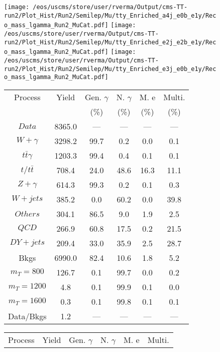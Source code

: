 \begin{figure}
\centering
\texttt{[image: /eos/uscms/store/user/rverma/Output/cms-TT-run2/Plot\_Hist/Run2/Semilep/Mu/tty\_Enriched\_a4j\_e0b\_e1y/Reco\_mass\_lgamma\_Run2\_MuCat.pdf]}
\texttt{[image: /eos/uscms/store/user/rverma/Output/cms-TT-run2/Plot\_Hist/Run2/Semilep/Mu/tty\_Enriched\_e2j\_e2b\_e1y/Reco\_mass\_lgamma\_Run2\_MuCat.pdf]}
\texttt{[image: /eos/uscms/store/user/rverma/Output/cms-TT-run2/Plot\_Hist/Run2/Semilep/Mu/tty\_Enriched\_e3j\_e0b\_e1y/Reco\_mass\_lgamma\_Run2\_MuCat.pdf]}
\begin{minipage}[c]{0.32\textwidth}
\centering
\tiny{
\begin{tabular}{cccccc}
\hline
Process & Yield & Gen. $\gamma$ & N. $\gamma$ & M. e & Multi. \\
 &  & (\%) & (\%) & (\%) & (\%)  \\
\hline
                                                                      $ Data $ &  8365.0 &  --- &  --- &  --- &  ---\\
$ W+\gamma $ &  3298.2 &  99.7 &  0.2 &  0.0 &  0.1\\
$ t\bar{t}\gamma $ &  1203.3 &  99.4 &  0.4 &  0.1 &  0.1\\
$ t/t\bar{t} $ &  708.4 &  24.0 &  48.6 &  16.3 &  11.1\\
$ Z+\gamma $ &  614.3 &  99.3 &  0.2 &  0.1 &  0.3\\
$ W+jets $ &  385.2 &  0.0 &  60.2 &  0.0 &  39.8\\
$ Others $ &  304.1 &  86.5 &  9.0 &  1.9 &  2.5\\
$ QCD $ &  266.9 &  60.8 &  17.5 &  0.2 &  21.5\\
$ DY+jets $ &  209.4 &  33.0 &  35.9 &  2.5 &  28.7\\
Bkgs &  6990.0 &  82.4 &  10.6 &  1.8 &  5.2\\
$ m_{T} = 800 $ &  126.7 &  0.1 &  99.7 &  0.0 &  0.2\\
$ m_{T} = 1200 $ &  4.8 &  0.1 &  99.9 &  0.1 &  0.0\\
$ m_{T} = 1600 $ &  0.3 &  0.1 &  99.8 &  0.1 &  0.1\\
Data/Bkgs &  1.2 &  --- &  --- &  --- &  ---\\
\hline
\end{tabular}
}
\end{minipage}
\begin{minipage}[c]{0.32\textwidth}
\centering
\tiny{
\begin{tabular}{cccccc}
\hline
Process & Yield & Gen. $\gamma$ & N. $\gamma$ & M. e & Multi. \\

\end{tabular}}
\end{minipage}
\end{figure}
